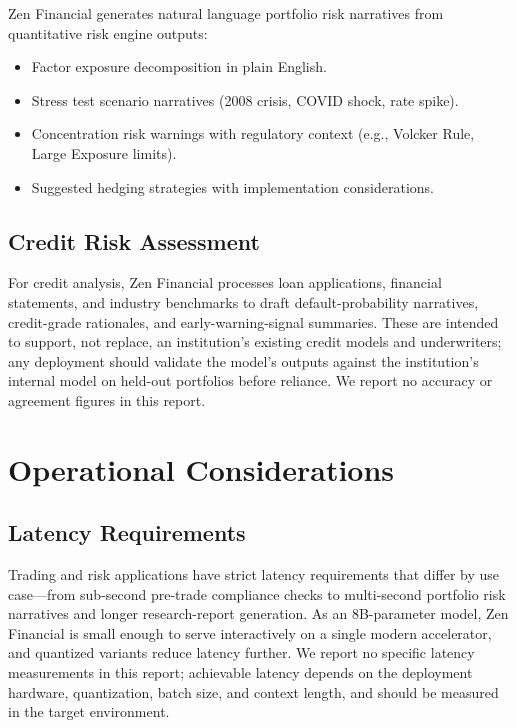 \documentclass[11pt,a4paper]{article}
\begin{document}
Zen Financial generates natural language portfolio risk narratives from quantitative risk engine outputs:

\begin{itemize}
  \item Factor exposure decomposition in plain English.
  \item Stress test scenario narratives (2008 crisis, COVID shock, rate spike).
  \item Concentration risk warnings with regulatory context (e.g., Volcker Rule, Large Exposure limits).
  \item Suggested hedging strategies with implementation considerations.
\end{itemize}

\subsection{Credit Risk Assessment}

For credit analysis, Zen Financial processes loan applications, financial statements, and industry benchmarks to draft default-probability narratives, credit-grade rationales, and early-warning-signal summaries. These are intended to support, not replace, an institution's existing credit models and underwriters; any deployment should validate the model's outputs against the institution's internal model on held-out portfolios before reliance. We report no accuracy or agreement figures in this report.

\section{Operational Considerations}

\subsection{Latency Requirements}

Trading and risk applications have strict latency requirements that differ by use case---from sub-second pre-trade compliance checks to multi-second portfolio risk narratives and longer research-report generation. As an 8B-parameter model, Zen Financial is small enough to serve interactively on a single modern accelerator, and quantized variants reduce latency further. We report no specific latency measurements in this report; achievable latency depends on the deployment hardware, quantization, batch size, and context length, and should be measured in the target environment.
\end{document}
